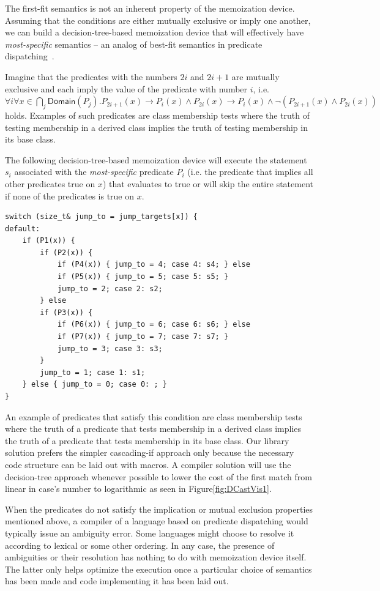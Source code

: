 The first-fit semantics is not an inherent property of the memoization device. 
Assuming that the conditions are either mutually exclusive or imply one another, we 
can build a decision-tree-based memoization device that will effectively have 
\emph{most-specific} semantics -- an analog of best-fit semantics in predicate 
dispatching~\cite{ErnstKC98}.

Imagine that the predicates with the numbers $2i$ and $2i+1$ are mutually exclusive and 
each imply the value of the predicate with number $i$, i.e.
$\forall i\forall x\in\bigcap_j\mathsf{Domain}(P_j).P_{2i+1}(x)\rightarrow P_i(x)\wedge P_{2i}(x)\rightarrow P_i(x)\wedge\neg(P_{2i+1}(x)\wedge P_{2i}(x))$ holds. 
Examples of such predicates are class membership tests where the truth of 
testing membership in a derived class implies the truth of testing membership in 
its base class.

The following decision-tree-based memoization device will execute the statement 
$s_i$ associated with the \emph{most-specific} predicate $P_i$ (i.e. the 
predicate that implies all other predicates true on $x$) that evaluates to true 
or will skip the entire statement if none of the predicates is true on $x$.

\begin{lstlisting}
switch (size_t& jump_to = jump_targets[x]) {
default:
    if (P1(x)) {
        if (P2(x)) {
            if (P4(x)) { jump_to = 4; case 4: s4; } else
            if (P5(x)) { jump_to = 5; case 5: s5; } 
            jump_to = 2; case 2: s2;
        } else
        if (P3(x)) {
            if (P6(x)) { jump_to = 6; case 6: s6; } else
            if (P7(x)) { jump_to = 7; case 7: s7; } 
            jump_to = 3; case 3: s3;
        }
        jump_to = 1; case 1: s1;
    } else { jump_to = 0; case 0: ; }
}
\end{lstlisting}

\noindent
An example of predicates that satisfy this condition are class membership tests
where the truth of a predicate that tests membership in a derived class implies 
the truth of a predicate that tests membership in its base class. 
Our library solution prefers the simpler cascading-if approach only because the 
necessary code structure can be laid out with macros. A compiler solution 
will use the decision-tree approach whenever possible to lower the cost of the 
first match from linear in case's number to logarithmic as seen in Figure\ref{fig:DCastVis1}.

When the predicates do not satisfy the implication or mutual exclusion properties 
mentioned above, a compiler of a language based on predicate dispatching would 
typically issue an ambiguity error. Some languages might choose to resolve it 
according to lexical or some other ordering. In any case, the presence of 
ambiguities or their resolution has nothing to do with memoization device 
itself. The latter only helps optimize the execution once a particular choice of 
semantics has been made and code implementing it has been laid out.

